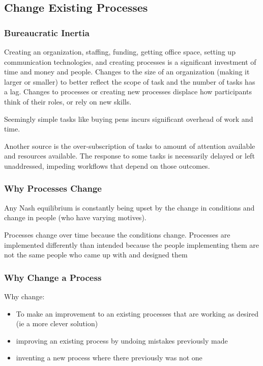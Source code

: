 \subsection{Change Existing Processes}

\subsubsection{Bureaucratic Inertia}

Creating an organization, staffing, funding, getting office space, setting up communication technologies, and creating processes is a significant investment of time and money and people. Changes to the size of an organization (making it larger or smaller) to better reflect the scope of task and the number of tasks has a lag. Changes to processes or creating new processes displace how participants think of their roles, or rely on new skills. 

Seemingly simple tasks like buying pens incurs significant overhead of work and time. 

Another source is the over-subscription of tasks to amount of attention available and resources available. The response to some tasks is necessarily delayed or left unaddressed, impeding workflows that depend on those outcomes. 



\subsubsection{Why Processes Change}

Any Nash equilibrium is constantly being upset by the change in conditions and change in people (who have varying motives).

Processes change over time because the conditions change. Processes are implemented differently than intended because the people implementing them are not the same people who came up with and designed them


\subsubsection{Why Change a Process}
Why change:
\begin{itemize}
    \item To make an improvement to an existing processes that are working as desired (ie a more clever solution)
    \item improving an existing process by undoing mistakes previously made
    \item inventing a new process where there previously was not one
\end{itemize}

